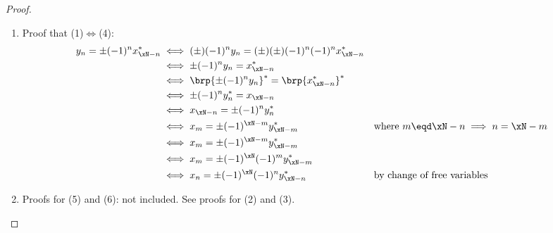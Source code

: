 \begin{proof}
\begin{enumerate}
  \item Proof that (1)$\iff$(4): %
    \begin{align*}
      y_{n} = \pm (-1)^n x^\ast_{\xN-n}
        &\iff (\pm)(-1)^n y_{n} = (\pm)(\pm) (-1)^n (-1)^n x^\ast_{\xN-n}
      \\&\iff \pm(-1)^n y_{n} = x^\ast_{\xN-n}
      \\&\iff \brp{\pm(-1)^n y_{n}}^\ast = \brp{x^\ast_{\xN-n}}^\ast
      \\&\iff \pm(-1)^n y^\ast_{n} = x_{\xN-n}
      \\&\iff x_{\xN-n} = \pm(-1)^n y^\ast_{n}
      \\&\iff x_m = \pm(-1)^{\xN-m} y^\ast_{\xN-m}
        &&    \text{where $m\eqd \xN-n\implies n=\xN-m$}
      \\&\iff x_m = \pm(-1)^{\xN-m} y^\ast_{\xN-m}
      \\&\iff x_m = \pm(-1)^\xN (-1)^m y^\ast_{\xN-m}
      \\&\iff x_n = \pm(-1)^\xN (-1)^n y^\ast_{\xN-n}
        &&    \text{by change of free variables}
    \end{align*} 

  \item Proofs for (5) and (6): not included. See proofs for (2) and (3).
\end{enumerate}
\end{proof}


